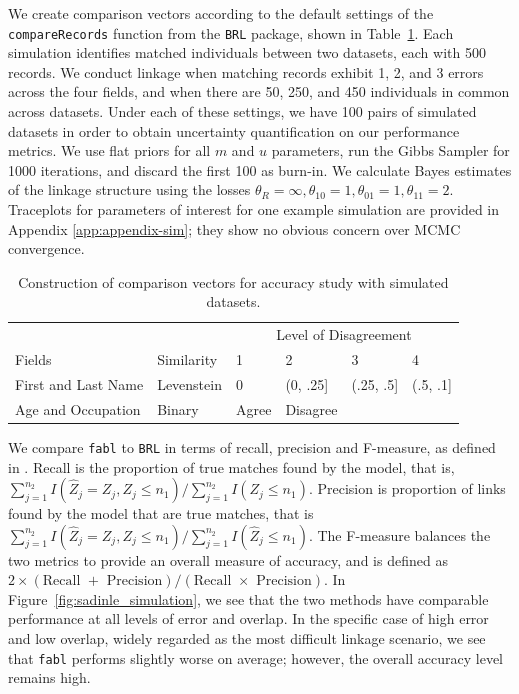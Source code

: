 \documentclass[ba]{imsart}
\begin{document}
	We create comparison vectors according to the default settings of the \texttt{compareRecords} function from the \texttt{BRL} package, shown in Table~\ref{Tab:sadinle_simulation_cutoffs}. Each simulation identifies matched individuals between two datasets, each with 500 records. We conduct linkage when matching records exhibit 1, 2, and 3 errors across the four fields, and when there are 50, 250, and 450 individuals in common across datasets. Under each of these settings, we have 100 pairs of simulated datasets in order to obtain uncertainty quantification on our performance metrics. We use flat priors for all $m$ and $u$ parameters, run the Gibbs Sampler for 1000 iterations, and discard the first 100 as burn-in. We calculate Bayes estimates of the linkage structure using the losses $\theta_R = \infty, \theta_{10} = 1, \theta_{01} = 1, \theta_{11} = 2$. Traceplots for parameters of interest for one example simulation are provided in Appendix \ref{app:appendix-sim}; they show no obvious concern over MCMC convergence.
	
	\begin{table}[t]
		\centering
		\begin{tabular}[t]{llllll}
			
			\multicolumn{2}{c}{ } & \multicolumn{4}{c}{Level of Disagreement} \\
			\cline{3-6}
			Fields & Similarity & 1 & 2 & 3 & 4\\
			\hline
			First and Last Name & Levenstein & 0 & (0, .25] & (.25, .5] & (.5, .1]\\
			Age and Occupation & Binary & Agree & Disagree &  & \\
			\hline
		\end{tabular}
		\caption{Construction of comparison vectors for accuracy study with simulated datasets.}
		\label{Tab:sadinle_simulation_cutoffs}
	\end{table}
	
	We compare \texttt{fabl} to \texttt{BRL} in terms of recall, precision and F-measure, as defined in \cite{christen_2012}. Recall is the proportion of true matches found by the model, that is, $\sum_{j=1}^{n_2} I(\hat{Z}_j = Z_j, Z_j \leq n_1) / \sum_{j=1}^{n_2} I(Z_j \leq n_1)$. Precision is proportion of links found by the model that are true matches, that is $\sum_{j=1}^{n_2} I(\hat{Z}_j = Z_j, Z_j \leq n_1) / \sum_{j=1}^{n_2} I(\hat{Z}_j \leq n_1)$. The F-measure balances the two metrics to provide an overall measure of accuracy, and is defined as $2 \times (\text{Recall } + \text{ Precision}) / (\text{Recall } \times \text{ Precision})$. In Figure~\ref{fig:sadinle_simulation}, we see that the two methods have comparable performance at all levels of error and overlap. In the specific case of high error and low overlap, widely regarded as the most difficult linkage scenario, we see that \texttt{fabl} performs slightly worse on average; however, the overall accuracy level remains high. 
	
\end{document}

